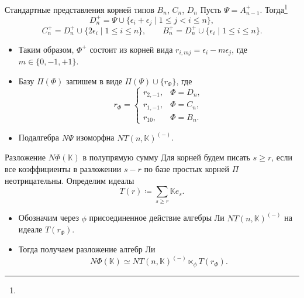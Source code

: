\documentclass[12pt,aspectratio=169]{beamer}
\newcommand{\K}{\mathbb{K}}
\newcommand{\sourcefootnote}[1]{\footnote{\slidecite{#1}}}
\begin{document}
\begin{frame}[t]{Стандартные представления корней типов $B_n$, $C_n$, $D_n$}
    \small
    Пусть $\Psi=A_{n-1}^+$. Тогда\sourcefootnote{bourbaki72}
    \[
        D_n^+=\Psi\cup\{\epsilon_i+\epsilon_j \mid 1\le j<i\le n\},
    \]
    \[
        C_n^+=D_n^+\cup\{2\epsilon_i \mid 1\le i\le n\},
        \qquad
        B_n^+=D_n^+\cup\{\epsilon_i \mid 1\le i\le n\}.
    \]

    \begin{itemize}
        \item Таким образом, $\Phi^+$ состоит из корней вида
              $r_{i,mj}=\epsilon_i-m\epsilon_j$, где $m\in\{0,-1,+1\}$.
        \item Базу $\Pi(\Phi)$ запишем в виде $\Pi(\Psi)\cup\{r_\Phi\}$, где
              \[
                  r_\Phi=
                  \begin{cases}
                      r_{2,-1}, & \Phi=D_n, \\
                      r_{1,-1}, & \Phi=C_n, \\
                      r_{10},   & \Phi=B_n.
                  \end{cases}
              \]
        \item Подалгебра $N\Psi$ изоморфна $NT(n,\K)^{(-)}$.
    \end{itemize}
\end{frame}

\begin{frame}[t]{Разложение $N\Phi(\K)$ в полупрямую сумму}
    \small
    Для корней будем писать $s\ge r$, если все коэффициенты в разложении $s-r$ по базе простых корней $\Pi$ неотрицательны. Определим идеалы
    \[
        T(r)\coloneq \sum_{s\ge r}\K e_s.
    \]

    \begin{itemize}
        \item Обозначим через $\phi$ присоединенное действие алгебры Ли $NT(n,\K)^{(-)}$ на
              идеале $T(r_\Phi)$.
        \item Тогда получаем разложение алгебр Ли
              \[
                  N\Phi(\K)\simeq NT(n,\K)^{(-)}\ltimes_\phi T(r_\Phi).
              \]
    \end{itemize}
\end{frame}
\end{document}
